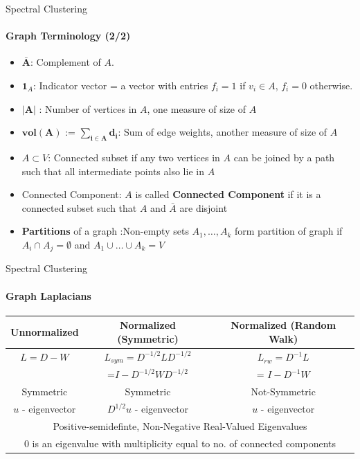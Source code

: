 \documentclass[10pt,a4paper, nocenter]{beamer}
\begin{document}
	\begin{frame}{Spectral Clustering}
		\framesubtitle{Graph Terminology (2/2)}
		
		\begin{itemize}
			\item<1-> $\mathbf{\bar{A}}$: Complement of $A$. 
			\item<2-> $\mathbf{1}_{A}$: Indicator vector = a vector with entries $f_{i} = 1$ if $v_{i} \in A$, $f_{i}=0$ otherwise.
			\item<3-> $\mathbf{\lvert A \rvert}$ : Number of vertices in $A$, one measure of size of $A$
			\item<4-> $\mathbf{vol(A)}$ := $\mathbf{\sum_{i\in A}d_{i}}$: Sum of edge weights, another measure of size of $A$
			\item<5-> $A \subset V$: Connected subset if any two vertices in $A$ can be joined by a path such that all intermediate points also lie in $A$
			\item<6-> Connected Component: $A$ is called \textbf{Connected Component} if it is a connected subset such that $A$ and $\bar{A}$ are disjoint
			\item<7-> \textbf{Partitions} of a graph :Non-empty sets $A_{1},\dots,A_{k}$ form partition of graph if $A_{i} \cap A_{j} = \emptyset$ and $A_{1}\cup \dots \cup A_{k} = V$
			
		\end{itemize}
	\end{frame}


	\begin{frame}{Spectral Clustering}
		\framesubtitle{Graph Laplacians}
		\begin{center}

			\begin{tabular}{|c|c|c|}
				\hline
				Unnormalized & Normalized (Symmetric) & Normalized (Random Walk)\\
				\hline
				$L = D-W$ & $L_{sym} = D^{-1/2}LD^{-1/2} $ & $L_{rw} = D^{-1}L$ \\
				 & =$ I - D^{-1/2}WD^{-1/2}$ & = $I - D^{-1}W$\\
				\hline
				Symmetric & Symmetric & Not-Symmetric \\
				\hline
				$u$ - eigenvector & $D^{1/2}u$ - eigenvector &  $u$ - eigenvector\\
				\hline
				\multicolumn{3}{|c|}{Positive-semidefinte, Non-Negative Real-Valued Eigenvalues}\\
				\hline
				\multicolumn{3}{|c|}{0 is an eigenvalue with multiplicity equal to no. of connected components}\\
				\hline
			\end{tabular}
		\end{center}
	\end{frame}
\end{document}
